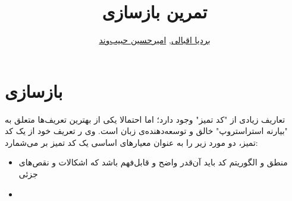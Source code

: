 \documentclass{utap}
\title{تمرین  بازسازی}
\author{
    \href{mailto:bardia.eghbali@gmail.com?subject=[AP\%20S98\%20Refactoring]\%20}{بردیا اقبالی},
    \href{mailto:ahhabibvand@gmail.com?subject=[AP\%20S98\%20Refactoring]\%20}{امیرحسین حبیب‌وند}
}
\begin{document}
\lstset{
    numbers=left,
    frame=leftline,
}

\maketitle

\section{بازسازی}
تعاریف زیادی از
"ﮐﺪ ﺗﻤﯿﺰ"
وجود دارد؛ اما احتمالا یکی از بهترین تعریف‌ها متعلق به
"ﺑﯿﺎرﻧﻪ اﺳﺘﺮاﺳﺘﺮوپ" 
خالق و توسعه‌دهنده‌ی زبان  است. وی ر تعریف خود از یک کد تمیز، دو مورد زیر را به عنوان معیار‌های اساسی یک کد تمیز بر می‌شمارد:

    \begin{itemize}
        \item 
منطق و الگوریتم کد باید آن‌قدر واضح و قابل‌فهم باشد که اشکالات و نقص‌های ﺟﺰﺋﯽ 

        \item
    \end{itemize}
 
	\begin{center}
	\end{center}
\end{document}
